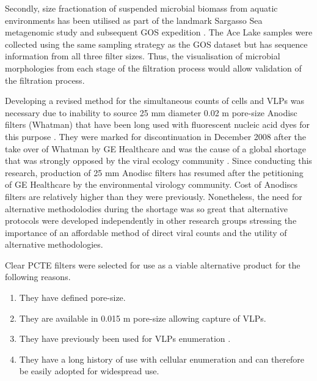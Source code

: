 Secondly, size fractionation of suspended microbial biomass from aquatic environments has been utilised as part of the landmark Sargasso Sea metagenomic study \cite{Venter2004} and subsequent \ac{GOS} expedition \cite{Rusch2007}.
The Ace Lake samples were collected using the same sampling strategy as the \ac{GOS} dataset but has sequence information from all three filter sizes. 
Thus, the visualisation of microbial morphologies from each stage of the filtration process would allow validation of the filtration process.

Developing a revised method for the simultaneous counts of cells and \acp{VLP} was necessary due to inability to source 25 mm diameter 0.02 \textmu{}m pore-size Anodisc filters (Whatman) that have been long used with fluorescent nucleic acid dyes for this purpose \cite{Hennes1995, Noble1998}. 
They were marked for discontinuation in December 2008 after the take over of Whatman by \textsc{GE} Healthcare and was the cause of a global shortage that was strongly opposed by the viral ecology community \cite{Torrice2009}.
Since conducting this research, production of 25 mm Anodisc filters has resumed after the petitioning of \textsc{GE} Healthcare by the environmental virology community. 
Cost of Anodiscs filters are relatively higher than they were previously. %
Nonetheless, the need for alternative methodolodies during the shortage was so great that alternative protocols were developed independently in other research groups \cite{Budinoff2011,Diemer2012} stressing the importance of an affordable method of direct viral counts and the utility of alternative methodologies. %

Clear \ac{PCTE} filters were selected for use as a viable alternative product for the following reasons. 
\begin{enumerate}
\item They have defined pore-size. %
\item They are available in 0.015 \textmu{}m pore-size allowing capture of \acp{VLP}.
\item They have previously been used for \acp{VLP} enumeration \cite{Hara1991,Proctor1992}.
\item They have a long history of use with cellular enumeration \cite{Hobbie1977} and can therefore be easily adopted for widespread use.
\end{enumerate}


